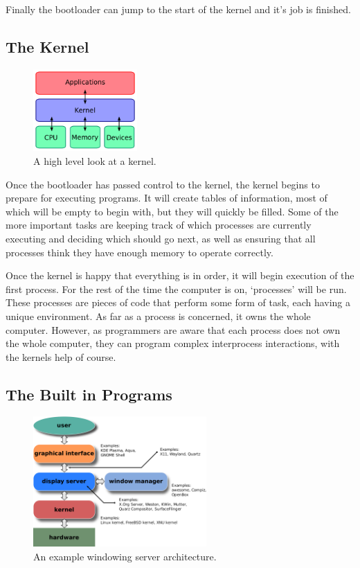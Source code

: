 \documentclass[a4paper]{report}
\begin{document}
Finally the bootloader can jump to the start of the kernel and it's job is finished.

\clearpage
\subsection{The Kernel}

\begin{figure}
\centering
\includegraphics[width=150px]{images/kernel}
\caption{A high level look at a kernel.}
\vspace{-10pt}
\label{fig:thekernel}
\end{figure}

Once the bootloader has passed control to the kernel, the kernel begins to prepare for executing programs. It will create tables of information, most of which will be empty to begin with, but they will quickly be filled. Some of the more important tasks are keeping track of which processes are currently executing and deciding which should go next, as well as ensuring that all processes think they have enough memory to operate correctly.

Once the kernel is happy that everything is in order, it will begin execution of the first process. For the rest of the time the computer is on, `processes' will be run. These processes are pieces of code that perform some form of task, each having a unique environment. As far as a process is concerned, it owns the whole computer. However, as programmers are aware that each process does not own the whole computer, they can program complex interprocess interactions, with the kernels help of course.


\subsection{The Built in Programs}

\begin{figure}
\centering
\includegraphics[width=250px]{images/windowing}
\caption{An example windowing server architecture.}
\label{fig:theserver}
\end{figure}
\end{document}
